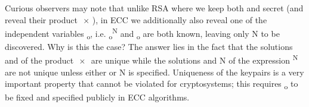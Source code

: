 \documentclass[a4paper,10pt]{article}
\begin{document}
\begin{flushleft}
{{	Curious observers may note that unlike RSA where we keep both {} and {} secret (and reveal their product {}$\,\times\,${}), in ECC we additionally also reveal one of the independent variables {}\textsubscript{o}, i.e. {}\textsubscript{o}\textsuperscript{N} and {}\textsubscript{o} are both known, leaving only N to be discovered. Why is this the case? The answer lies in the fact that the solutions {} and {} of the product {}$\,\times\,${} are unique while the solutions {} and N of the expression {}\textsuperscript{N} are not unique unless either {} or N is specified. Uniqueness of the keypairs is a very important property that cannot be violated for cryptosystems; this requires {}\textsubscript{o} to be fixed and specified publicly in ECC algorithms.\linebreak\linebreak
	}}
	\colorbox{Gray}{\hspace{1mm}\parbox{1.0\textwidth}{\vspace{1mm}\textls[-50]{\mono{
	\vspace{1mm}}}}}\linebreak\linebreak\linebreak
	\textbf{\Large{}}\linebreak\linebreak
	\textls[-50]{\mono{
	}}
\end{flushleft}
\begin{flushleft}
	\textbf{\Large{}}\linebreak\linebreak
\end{flushleft}
\end{document}
